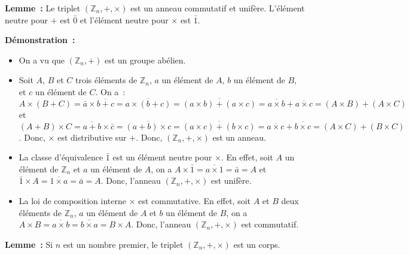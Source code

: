 \done

\medskip

\noindent\textbf{Lemme :} Le triplet $\left( \mathbb{Z}_n, +, \times \right)$ est un anneau commutatif et unifère. 
    L'élément neutre pour $+$ est $\bar{0}$ et l'élément neutre pour $\times$ est $\bar{1}$.

\medskip

\noindent\textbf{Démonstration :} 
\begin{itemize}[nosep]
    \item On a vu que $\left( \mathbb{Z}_n, + \right)$ est un groupe abélien.
    \item Soit $A$, $B$ et $C$ trois éléments de $\mathbb{Z}_n$, $a$ un élément de $A$, $b$ un élément de $B$, et $c$ un élément de $C$.
        On a : $A \times (B + C) = \bar{a} \times \overline{b+c} = \overline{a \times (b+c)} = \overline{(a \times b) + (a \times c)} = \overline{a \times b} + \overline{a \times c} = (A \times B) + (A \times C)$ et $(A+B) \times C  = \overline{a+b} \times \bar{c} = \overline{(a+b) \times c} = \overline{(a \times c) + (b \times c)} = \overline{a \times c} + \overline{b \times c} = (A \times C) + (B \times C)$.
        Donc, $\times$ est distributive sur $+$.
        Donc, $\left( \mathbb{Z}_n, +, \times \right)$ est un anneau.
    \item La classe d'équivalence $\bar{1}$ est un élément neutre pour $\times$. 
        En effet, soit $A$ un élément de $\mathbb{Z}_n$ et $a$ un élément de $A$, on a $A \times \bar{1} = \overline{a \times 1} = \bar{a} = A$ et $\bar{1} \times A = \overline{1 \times a} = \bar{a} = A$.
        Donc, l'anneau $\left( \mathbb{Z}_n, +, \times \right)$ est unifère.
    \item La loi de composition interne $\times$ est commutative.
        En effet, soit $A$ et $B$ deux éléments de $\mathbb{Z}_n$, $a$ un élément de $A$ et $b$ un élément de $B$, on a $A \times B = \overline{a \times b} = \bar{b \times a} = B \times A$.
        Donc, l'anneau $\left( \mathbb{Z}_n, +, \times \right)$ est commutatif.
\end{itemize}

\done

\medskip

\noindent\textbf{Lemme :} Si $n$ est un nombre premier, le triplet $\left( \mathbb{Z}_n, +, \times \right)$ est un corps. 

\medskip

